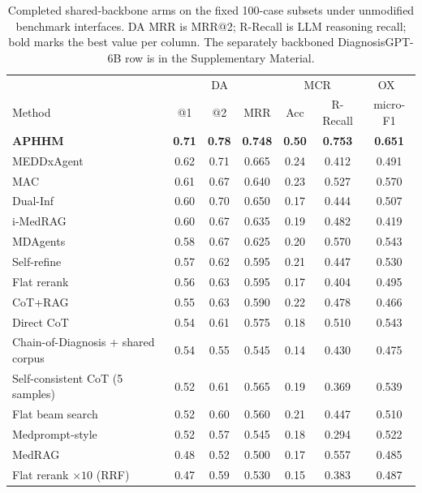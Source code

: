 \documentclass[letterpaper]{article} %
\begin{document}
\begin{table}[t]
\centering
\small
\begin{tabular}{@{}lcccccc@{}}
\toprule
& \multicolumn{3}{c}{DA~\cite{diagnosisarena}} &
\multicolumn{2}{c}{MCR~\cite{medcasereasoning}} &
\multicolumn{1}{c}{OX~\cite{dualinf2025}} \\
Method & @1 & @2 & MRR & Acc & R-Recall & micro-F1 \\
\midrule
\textbf{APHHM} & \textbf{0.71} & \textbf{0.78} & \textbf{0.748} & \textbf{0.50} & \textbf{0.753} & \textbf{0.651} \\
MEDDxAgent & 0.62 & 0.71 & 0.665 & 0.24 & 0.412 & 0.491 \\
MAC & 0.61 & 0.67 & 0.640 & 0.23 & 0.527 & 0.570 \\
Dual-Inf & 0.60 & 0.70 & 0.650 & 0.17 & 0.444 & 0.507 \\
i-MedRAG & 0.60 & 0.67 & 0.635 & 0.19 & 0.482 & 0.419 \\
MDAgents & 0.58 & 0.67 & 0.625 & 0.20 & 0.570 & 0.543 \\
Self-refine & 0.57 & 0.62 & 0.595 & 0.21 & 0.447 & 0.530 \\
Flat rerank & 0.56 & 0.63 & 0.595 & 0.17 & 0.404 & 0.495 \\
CoT+RAG & 0.55 & 0.63 & 0.590 & 0.22 & 0.478 & 0.466 \\
Direct CoT & 0.54 & 0.61 & 0.575 & 0.18 & 0.510 & 0.543 \\
Chain-of-Diagnosis + shared corpus & 0.54 & 0.55 & 0.545 & 0.14 & 0.430 & 0.475 \\
Self-consistent CoT (5 samples) & 0.52 & 0.61 & 0.565 & 0.19 & 0.369 & 0.539 \\
Flat beam search & 0.52 & 0.60 & 0.560 & 0.21 & 0.447 & 0.510 \\
Medprompt-style & 0.52 & 0.57 & 0.545 & 0.18 & 0.294 & 0.522 \\
MedRAG & 0.48 & 0.52 & 0.500 & 0.17 & 0.557 & 0.485 \\
\midrule
Flat rerank $\times 10$ (RRF) & 0.47 & 0.59 & 0.530 & 0.15 & 0.383 & 0.487 \\
\bottomrule
\end{tabular}
\caption{Completed shared-backbone arms on the fixed 100-case subsets under unmodified benchmark interfaces. DA MRR is MRR@2; R-Recall is LLM reasoning recall; bold marks the best value per column. The separately backboned DiagnosisGPT-6B row is in the Supplementary Material.}
\label{tab:main}

\end{table}
\end{document}
